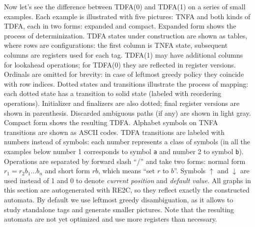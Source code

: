 \documentclass{article}
\newcommand{\Xeq}{\!=\!}
\theoremstyle{definition}
\begin{document}
\begin{multicols}{2}
Now let's see the difference between TDFA(0) and TDFA(1) on a series of small examples.
Each example is illustrated with five pictures:
TNFA and both kinds of TDFA, each in two forms: expanded and compact.
Expanded form shows the process of determinization.
TDFA states under construction are shown as tables, where rows are configurations:
the first column is TNFA state, subsequent columns are registers used for each tag.
TDFA(1) may have additional columns for lookahead operations;
for TDFA(0) they are reflected in register versions.
Ordinals are omitted for brevity: in case of leftmost greedy policy they coincide with row indices.
Dotted states and transitions illustrate the process of mapping:
each dotted state has a transition to solid state (labeled with reordering operations).
Initializer and finalizers are also dotted;
final register versions are shown in parenthesis.
Discarded ambiguous paths (if any) are shown in light gray.
Compact form shows the resulting TDFA.
Alphabet symbols on TNFA transitions are shown as ASCII codes.
TDFA transitions are labeled with numbers instead of symbols: each number represents a class of symbols
(in all the examples below number 1 corresponds to symbol \texttt{a} and number 2 to symbol \texttt{b}).
Operations are separated by forward slash ``/'' and take two forms: normal form $r_1 \Xeq r_2 b_1 \dots b_n$
and short form $r b$, which means ``set $r$ to $b$''.
Symbols $\uparrow$ and $\downarrow$ are used instead of 1 and 0 to denote \emph{current position} and \emph{default value}.
All graphs in this section are autogenerated with RE2C, so they reflect exactly the constructed automata.
By default we use leftmost greedy disambiguation, as it allows to study standalone tags and generate smaller pictures.
Note that the resulting automata are not yet optimized and use more registers than necessary.
\\

\end{multicols}
\end{document}
